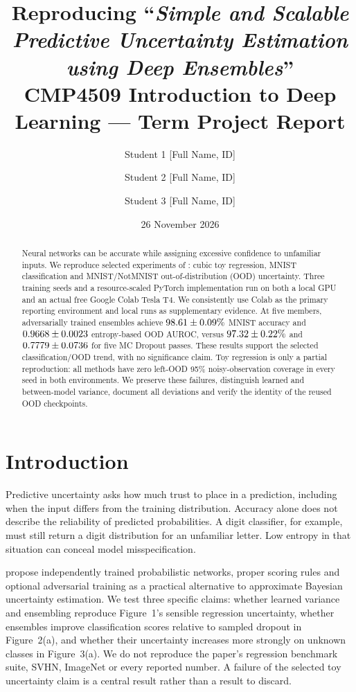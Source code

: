 \documentclass[11pt,a4paper]{article}
\title{Reproducing ``\textit{Simple and Scalable Predictive Uncertainty Estimation using Deep Ensembles}''\\[0.3em]
\large CMP4509 Introduction to Deep Learning --- Term Project Report}
\author{Student 1 [Full Name, ID] \and Student 2 [Full Name, ID] \and Student 3 [Full Name, ID]}
\date{26 November 2026}
\begin{document}
\maketitle
\begin{abstract}
Neural networks can be accurate while assigning excessive confidence to unfamiliar inputs. We reproduce selected experiments of \citet{lakshminarayanan2017simple}: cubic toy regression, MNIST classification and MNIST/NotMNIST out-of-distribution (OOD) uncertainty. Three training seeds and a resource-scaled PyTorch implementation run on both a local GPU and an actual free Google Colab Tesla T4. We consistently use Colab as the primary reporting environment and local runs as supplementary evidence. At five members, adversarially trained ensembles achieve $98.61 \pm 0.09\%$ MNIST accuracy and $0.9668 \pm 0.0023$ entropy-based OOD AUROC, versus $97.32 \pm 0.22\%$ and $0.7779 \pm 0.0736$ for five MC Dropout passes. These results support the selected classification/OOD trend, with no significance claim. Toy regression is only a partial reproduction: all methods have zero left-OOD 95\% noisy-observation coverage in every seed in both environments. We preserve these failures, distinguish learned and between-model variance, document all deviations and verify the identity of the reused OOD checkpoints.
\end{abstract}

\section{Introduction}
\label{sec:intro}
Predictive uncertainty asks how much trust to place in a prediction, including when the input differs from the training distribution. Accuracy alone does not describe the reliability of predicted probabilities. A digit classifier, for example, must still return a digit distribution for an unfamiliar letter. Low entropy in that situation can conceal model misspecification.

\citet{lakshminarayanan2017simple} propose independently trained probabilistic networks, proper scoring rules and optional adversarial training as a practical alternative to approximate Bayesian uncertainty estimation. We test three specific claims: whether learned variance and ensembling reproduce Figure~1's sensible regression uncertainty, whether ensembles improve classification scores relative to sampled dropout in Figure~2(a), and whether their uncertainty increases more strongly on unknown classes in Figure~3(a). We do not reproduce the paper's regression benchmark suite, SVHN, ImageNet or every reported number. A failure of the selected toy uncertainty claim is a central result rather than a result to discard.
\end{document}
